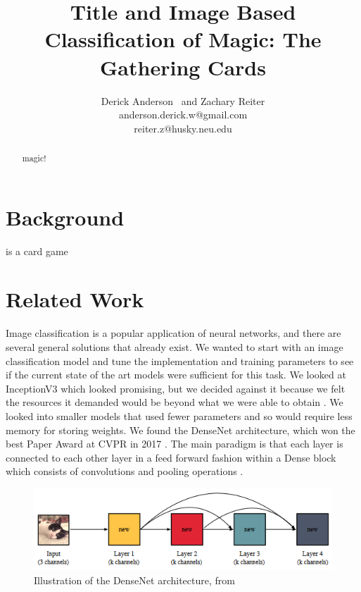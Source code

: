 \documentclass[letterpaper]{article} %
\begin{document}
%
\title{Title and Image Based Classification of Magic: The Gathering Cards}
\author{Derick Anderson \ and Zachary Reiter\\
  anderson.derick.w@gmail.com\\
  reiter.z@husky.neu.edu
}
\maketitle
\begin{abstract}
magic!
\end{abstract}



\section{Background}

is a card game

\section{Related Work}

Image classification is a popular application of neural networks,
and there are several general solutions that already exist. We wanted to start with an
image classification model and tune the implementation and training parameters
to see if the current state of the art models were sufficient for this task.
We looked at InceptionV3 which looked promising, but we decided against it
because we felt the resources it demanded would be beyond what we were able to
obtain \cite{SzegedyChristian2015RtIA}. We looked into smaller models that used fewer
parameters and so would require less memory for storing weights. We found the
DenseNet architecture, which won the best Paper Award at CVPR in
2017 \cite{huang2017densely}. The main paradigm is that each layer is connected to each
other layer in a feed forward fashion within a Dense block which consists of
convolutions and pooling operations \cite{huang2017densely}.

\begin{figure}
  \includegraphics[width=.5\textwidth]{densenet}
  \caption{Illustration of the DenseNet architecture, from \cite{PleissGeoff2017MIoD}}
\end{figure}
\end{document}

